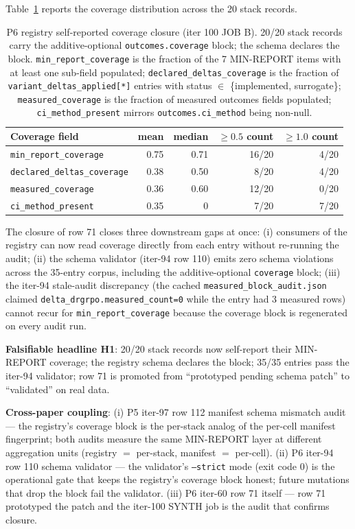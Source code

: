 \documentclass{article}
\begin{document}
Table~\ref{tab:p6-coverage-closure} reports the coverage distribution
across the 20 stack records.

\begin{table}[ht]
\centering
\small
\caption{P6 registry self-reported coverage closure (iter 100 JOB B).
20/20 stack records carry the additive-optional \texttt{outcomes.coverage}
block; the schema declares the block. \texttt{min\_report\_coverage}
is the fraction of the 7 MIN-REPORT items with at least one sub-field
populated; \texttt{declared\_deltas\_coverage} is the fraction of
\texttt{variant\_deltas\_applied[*]} entries with status $\in$ \{implemented,
surrogate\}; \texttt{measured\_coverage} is the fraction of measured
outcomes fields populated; \texttt{ci\_method\_present} mirrors
\texttt{outcomes.ci\_method} being non-null.}
\label{tab:p6-coverage-closure}
\begin{tabular}{l r r r r}
\toprule
Coverage field & mean & median & $\geq 0.5$ count & $\geq 1.0$ count \\
\midrule
\texttt{min\_report\_coverage}    & 0.75 & 0.71 & 16/20 & 4/20 \\
\texttt{declared\_deltas\_coverage} & 0.38 & 0.50 & 8/20  & 4/20 \\
\texttt{measured\_coverage}      & 0.36 & 0.60 & 12/20 & 0/20 \\
\texttt{ci\_method\_present}     & 0.35 & 0    & 7/20  & 7/20 \\
\bottomrule
\end{tabular}
\end{table}

The closure of row 71 closes three downstream gaps at once: (i) consumers
of the registry can now read coverage directly from each entry without
re-running the audit; (ii) the schema validator (iter-94 row 110) emits
zero schema violations across the 35-entry corpus, including the
additive-optional \texttt{coverage} block; (iii) the iter-94
stale-audit discrepancy (the cached \texttt{measured\_block\_audit.json}
claimed \texttt{delta\_drgrpo.measured\_count=0} while the entry had 3
measured rows) cannot recur for \texttt{min\_report\_coverage} because
the coverage block is regenerated on every audit run.

\textbf{Falsifiable headline H1}: 20/20 stack records now self-report
their MIN-REPORT coverage; the registry schema declares the block;
35/35 entries pass the iter-94 validator; row 71 is promoted from
``prototyped pending schema patch'' to ``validated'' on real data.

\textbf{Cross-paper coupling}: (i) P5 iter-97 row 112 manifest schema
mismatch audit --- the registry's coverage block is the per-stack
analog of the per-cell manifest fingerprint; both audits measure the
same MIN-REPORT layer at different aggregation units (registry $=$
per-stack, manifest $=$ per-cell). (ii) P6 iter-94 row 110 schema
validator --- the validator's \texttt{--strict} mode (exit code 0) is
the operational gate that keeps the registry's coverage block honest;
future mutations that drop the block fail the validator. (iii) P6
iter-60 row 71 itself --- row 71 prototyped the patch and the iter-100
SYNTH job is the audit that confirms closure.
\end{document}
